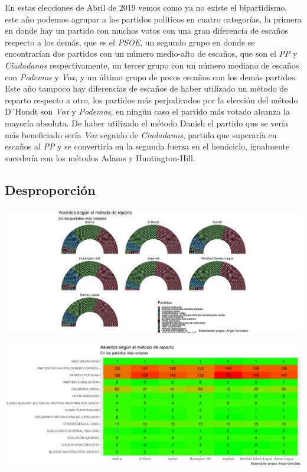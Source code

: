 \documentclass[12pt,a4paper,]{book}
\numberwithin{dummy}{section}
\theoremstyle{ocrenumbox}
\theoremstyle{blacknumex}
\theoremstyle{blacknumbox}
\theoremstyle{ocrenum}
\theoremstyle{ocrenum}
\begin{document}
En estas elecciones de Abril de 2019 vemos como ya no existe el
bipartidismo, este año podemos agrupar a los partidos políticos en
cuatro categorías, la primera en donde hay un partido con muchos votos
con una gran diferencia de escaños respecto a los demás, que es el
\emph{PSOE}, un segundo grupo en donde se encontrarían dos partidos con
un número medio-alto de escaños, que son el \emph{PP} y
\emph{Ciudadanos} respectivamente, un tercer grupo con un número mediano
de escaños con \emph{Podemos} y \emph{Vox}, y un último grupo de pocos
escaños con los demás partidos. Este año tampoco hay diferencias de
escaños de haber utilizado un método de reparto respecto a otro, los
partidos más perjudicados por la elección del método D´Hondt son
\emph{Vox} y \emph{Podemos}, en ningún caso el partido más votado
alcanza la mayoría absoluta. De haber utilizado el método Danish el
partido que se vería más beneficiado sería \emph{Vox} seguido de
\emph{Ciudadanos}, partido que superaría en escaños al \emph{PP} y se
convertiría en la segunda fuerza en el hemiciclo, igualmente sucedería
con los métodos Adams y Huntington-Hill.

\hypertarget{desproporciuxf3n-13}{%
\subsection{Desproporción}\label{desproporciuxf3n-13}}

\begin{center}\includegraphics[width=1\linewidth]{figurasR/unnamed-chunk-116-1} \end{center}

\begin{center}\includegraphics[width=1\linewidth]{figurasR/unnamed-chunk-116-2} \end{center}
\end{document}
